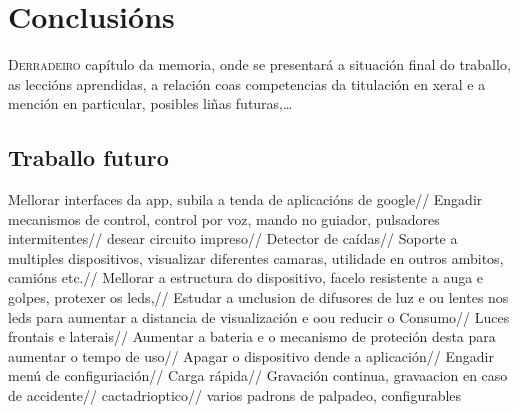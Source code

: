 \chapter{Conclusións}
\label{chap:conclusions}

\lettrine{D}{erradeiro} capítulo da memoria, onde se presentará a
situación final do traballo, as leccións aprendidas, a relación coas
competencias da titulación en xeral e a mención en particular,
posibles liñas futuras,\dots
\section{Traballo futuro}
Mellorar interfaces da app, subila a tenda de aplicacións de google//
Engadir mecanismos de control, control por voz, mando no guiador, pulsadores intermitentes//
desear circuito impreso//
Detector de caídas//
Soporte a multiples dispositivos, visualizar diferentes camaras, utilidade en outros ambitos, camións etc.//
Mellorar a estructura do dispositivo, facelo resistente a auga e golpes, protexer os leds,//
Estudar a unclusion de difusores de luz e ou lentes nos leds para aumentar a distancia de visualización e oou reducir o Consumo//
Luces frontais e laterais//
Aumentar a bateria e o mecanismo de proteción desta para aumentar o tempo de uso//
Apagar o dispositivo dende a aplicación//
Engadir menú de configuriación//
Carga rápida//
Gravación continua, gravaacion en caso de accidente//
cactadrioptico//
varios padrons de palpadeo, configurables 

